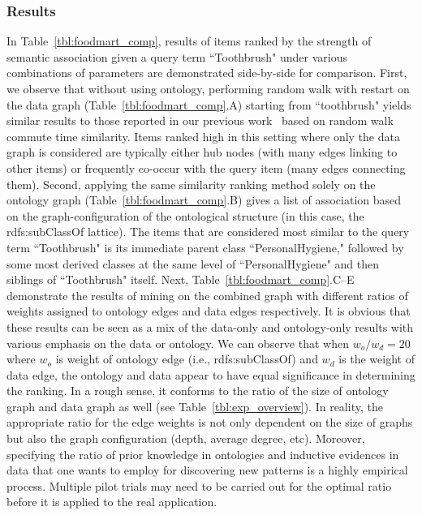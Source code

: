 \subsubsection{Results}
In Table~\ref{tbl:foodmart_comp}, results of items ranked by the strength of semantic association given a query term ``Toothbrush" under various combinations of parameters are demonstrated side-by-side for comparison. First, we observe that without using ontology, performing random walk with restart on the data graph (Table~\ref{tbl:foodmart_comp}.A) starting from ``toothbrush" yields similar results to those reported in our previous work~\cite{LiuEtal11} based on random walk commute time similarity. Items ranked high in this setting where only the data graph is considered are typically either hub nodes (with many edges linking to other items) or frequently co-occur with the query item (many edges connecting them). Second, applying the same similarity ranking method solely on the ontology graph (Table~\ref{tbl:foodmart_comp}.B) gives a list of association based on the graph-configuration of the ontological structure (in this case, the rdfs:subClassOf lattice). The items that are considered most similar to the query term ``Toothbrush" is its immediate parent class ``PersonalHygiene," followed by some most derived classes at the same level of ``PersonalHygiene" and then siblings of ``Toothbrush" itself. Next, Table~\ref{tbl:foodmart_comp}.C--E demonstrate the results of mining on the combined graph with different ratios of weights assigned to ontology edges and data edges respectively. It is obvious that these results can be seen as a mix of the data-only and ontology-only results with various emphasis on the data or ontology. We can observe that when $w_o/w_d=20$ where $w_o$ is weight of ontology edge (i.e., rdfs:subClassOf) and $w_d$ is the weight of data edge, the ontology and data appear to have equal significance in determining the ranking. In a rough sense, it conforms to the ratio of the size of ontology graph and data graph as well (see Table~\ref{tbl:exp_overview}). In reality, the appropriate ratio for the edge weights is not only dependent on the size of graphs but also the graph configuration (depth, average degree, etc). Moreover, specifying the ratio of prior knowledge in ontologies and inductive evidences in data that one wants to employ for discovering new patterns is a highly empirical process. Multiple pilot trials may need to be carried out for the optimal ratio before it is applied to the real application.

